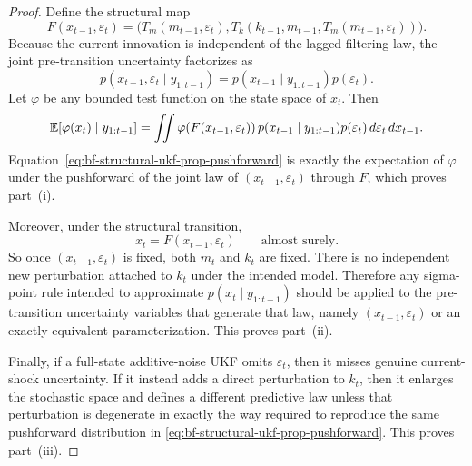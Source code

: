 \begin{proof}
Define the structural map
\begin{equation}
  F(x_{t-1},\varepsilon_t)
  =
  \bigl(T_m(m_{t-1},\varepsilon_t),
  T_k(k_{t-1},m_{t-1},T_m(m_{t-1},\varepsilon_t))\bigr).
  \label{eq:bf-structural-ukf-prop-map}
\end{equation}
Because the current innovation is independent of the lagged filtering law, the
joint pre-transition uncertainty factorizes as
\begin{equation}
  p(x_{t-1},\varepsilon_t\mid y_{1:t-1})
  =
  p(x_{t-1}\mid y_{1:t-1})p(\varepsilon_t).
  \label{eq:bf-structural-ukf-prop-factorization}
\end{equation}
Let $\varphi$ be any bounded test function on the state space of $x_t$.  Then
\begin{equation}
  \mathbb{E}\!\left[\varphi(x_t)\mid y_{1:t-1}\right]
  =
  \iint
  \varphi\!\left(F(x_{t-1},\varepsilon_t)\right)
  p(x_{t-1}\mid y_{1:t-1})p(\varepsilon_t)
  \, d\varepsilon_t \, dx_{t-1}.
  \label{eq:bf-structural-ukf-prop-pushforward}
\end{equation}
Equation~\eqref{eq:bf-structural-ukf-prop-pushforward} is exactly the
expectation of $\varphi$ under the pushforward of the joint law of
$(x_{t-1},\varepsilon_t)$ through $F$, which proves part~(i).

Moreover, under the structural transition,
\begin{equation}
  x_t = F(x_{t-1},\varepsilon_t)
  \qquad \text{almost surely.}
  \label{eq:bf-structural-ukf-prop-deterministic-completion}
\end{equation}
So once $(x_{t-1},\varepsilon_t)$ is fixed, both $m_t$ and $k_t$ are fixed.
There is no independent new perturbation attached to $k_t$ under the intended
model.  Therefore any sigma-point rule intended to approximate
$p(x_t\mid y_{1:t-1})$ should be applied to the pre-transition uncertainty
variables that generate that law, namely $(x_{t-1},\varepsilon_t)$ or an
exactly equivalent parameterization.  This proves part~(ii).

Finally, if a full-state additive-noise UKF omits $\varepsilon_t$, then it
misses genuine current-shock uncertainty.  If it instead adds a direct
perturbation to $k_t$, then it enlarges the stochastic space and defines a
different predictive law unless that perturbation is degenerate in exactly the
way required to reproduce the same pushforward distribution in
\eqref{eq:bf-structural-ukf-prop-pushforward}.  This proves part~(iii).
\end{proof}

